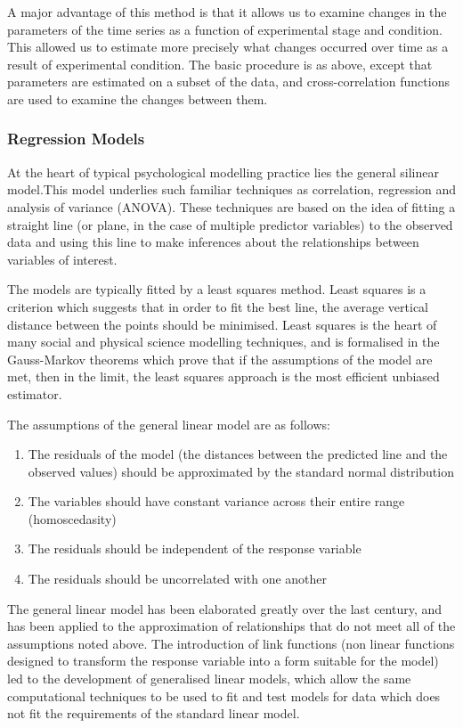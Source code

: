 A major advantage of this method is that it allows us to examine changes in the parameters of the time series as a function of experimental stage and condition. This allowed us to estimate more precisely what changes occurred over time as a result of experimental condition. The basic procedure is as above, except that parameters are estimated on a subset of the data, and cross-correlation functions are used to examine the changes between them. 


\subsubsection{Regression Models}

At the heart of typical psychological modelling practice lies the general silinear model.This model underlies such familiar techniques as correlation, regression and analysis of variance (ANOVA)\cite{gelman2007data}. These techniques are based on the idea of fitting a straight line (or plane, in the case of multiple predictor variables) to the observed data and using this line to make inferences about the relationships between variables of interest. 

The models are typically fitted by a least squares method. Least squares is a criterion which suggests that in order to fit the best line, the average vertical distance between the points should be minimised. Least squares is the heart of many social and physical science modelling techniques, and is formalised in the Gauss-Markov theorems which prove that if the assumptions of the model are met, then in the limit, the least squares approach is the most efficient unbiased estimator. 

The assumptions of the general linear model are as follows:
\begin{enumerate}
\item The residuals of the model (the distances between the predicted line and the observed values) should be approximated by the standard normal distribution
\item The variables should have constant variance across their entire range (homoscedasity)
\item The residuals should be independent of the response variable

\item The residuals should be uncorrelated with one another
\end{enumerate}

The general linear model has been elaborated greatly over the last century, and has been applied to the approximation of relationships that do not meet all of the assumptions noted above\cite{gelman2007data}. The introduction of link functions (non linear functions designed to transform the response variable into a form suitable for the model)  led to the development of generalised linear models, which allow the same computational techniques to be used to fit and test models for data which does not fit the requirements of the standard linear model. 

